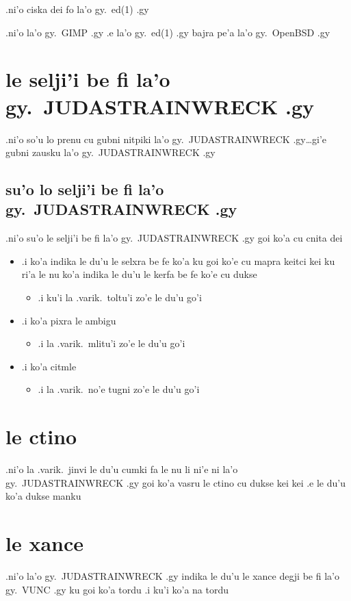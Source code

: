 \documentclass{report}
\begin{document}
.ni'o ciska dei fo la'o gy.\ ed(1) .gy

.ni'o la'o gy.\ GIMP .gy .e la'o gy.\ ed(1) .gy bajra pe'a la'o gy.\ OpenBSD .gy

\section{le selji'i be fi la'o gy.\ JUDASTRAINWRECK .gy}
.ni'o so'u lo prenu cu gubni nitpiki la'o gy.\ JUDASTRAINWRECK .gy\ldots gi'e gubni zausku la'o gy.\ JUDASTRAINWRECK .gy

\subsection{su'o lo selji'i be fi la'o gy.\ JUDASTRAINWRECK .gy}
.ni'o su'o le selji'i be fi la'o gy.\ JUDASTRAINWRECK .gy goi ko'a cu cnita dei

\begin{itemize}
	\item .i ko'a indika le du'u le selxra be fe ko'a ku goi ko'e cu mapra keitci kei ku ri'a le nu ko'a indika le du'u le kerfa be fe ko'e cu dukse 
	\begin{itemize}
		\item .i ku'i la .varik.\ toltu'i zo'e le du'u go'i
	\end{itemize}
	\item .i ko'a pixra le ambigu
	\begin{itemize}
		\item .i la .varik.\ mlitu'i zo'e le du'u go'i
	\end{itemize}
	\item .i ko'a citmle
	\begin{itemize}
		\item .i la .varik.\ no'e tugni zo'e le du'u go'i
	\end{itemize}
\end{itemize}
\section{le ctino}
.ni'o la .varik.\ jinvi le du'u cumki fa le nu li ni'e ni la'o gy.\ JUDASTRAINWRECK .gy goi ko'a vasru le ctino cu dukse kei kei .e le du'u ko'a dukse manku

\section{le xance}
.ni'o la'o gy.\ JUDASTRAINWRECK .gy indika le du'u le xance degji be fi la'o gy.\ VUNC .gy ku goi ko'a tordu  .i ku'i ko'a na tordu
\end{document}

